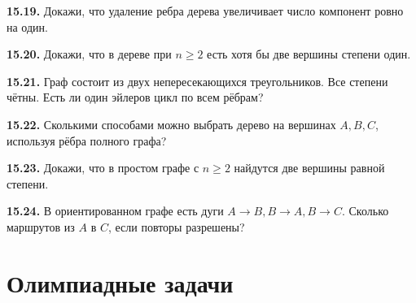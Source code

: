\noindent\begin{minipage}[t]{\linewidth}\textbf{15.19.}\starmark{} Докажи, что удаление ребра дерева увеличивает число компонент ровно на один.\par\end{minipage}\par
\noindent\begin{minipage}[t]{\linewidth}\textbf{15.20.}\starmark{} Докажи, что в дереве при \(n\ge2\) есть хотя бы две вершины степени один.\par\end{minipage}\par
\noindent\begin{minipage}[t]{\linewidth}\textbf{15.21.}\starmark{} Граф состоит из двух непересекающихся треугольников. Все степени чётны. Есть ли один эйлеров цикл по всем рёбрам?\par\end{minipage}\par
\noindent\begin{minipage}[t]{\linewidth}\textbf{15.22.} Сколькими способами можно выбрать дерево на вершинах \(A,B,C\), используя рёбра полного графа?\par\end{minipage}\par
\noindent\begin{minipage}[t]{\linewidth}\textbf{15.23.}\starmark{} Докажи, что в простом графе с \(n\ge2\) найдутся две вершины равной степени.\par\end{minipage}\par
\noindent\begin{minipage}[t]{\linewidth}\textbf{15.24.}\starmark{} В ориентированном графе есть дуги \(A\to B,B\to A,B\to C\). Сколько маршрутов из \(A\) в \(C\), если повторы разрешены?\par\end{minipage}\par
\par{}\section*{Олимпиадные задачи}
